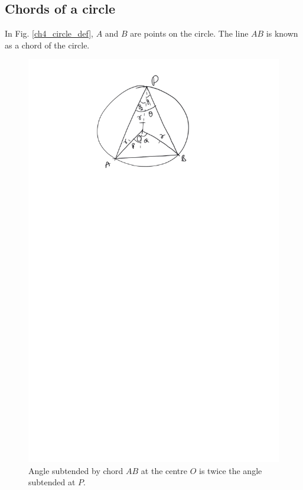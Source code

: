\subsection{Chords of a circle}
\begin{definition}
	In Fig. \ref{ch4_circle_def}, $A$ and $B$ are points on the circle.  The line $AB$ is known as a chord of the circle.
\end{definition}
%
\begin{figure}[!h]
	\begin{center}
		
		\includegraphics[width=\columnwidth]{./figs/ch4_circle_subtend}
		\vspace*{-10cm}
	\end{center}
	\caption{Angle subtended by chord $AB$ at the centre $O$ is twice the angle subtended at $P$. }
	\label{ch4_circle_subtend}	
\end{figure}
